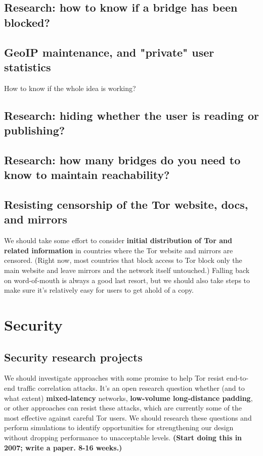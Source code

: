 \documentclass{article}
\newcommand{\plan}[1]{ {\bf (#1)}}
\begin{document}
\subsection{Research: how to know if a bridge has been blocked?}

\subsection{GeoIP maintenance, and "private" user statistics}
How to know if the whole idea is working?

\subsection{Research: hiding whether the user is reading or publishing?}

\subsection{Research: how many bridges do you need to know to maintain
reachability?}

\subsection{Resisting censorship of the Tor website, docs, and mirrors}

We should take some effort to consider {\bf initial distribution of Tor and
  related information} in countries where the Tor website and mirrors are
censored.  (Right now, most countries that block access to Tor block only the
main website and leave mirrors and the network itself untouched.)  Falling
back on word-of-mouth is always a good last resort, but we should also take
steps to make sure it's relatively easy for users to get ahold of a copy.

\section{Security}

\subsection{Security research projects}

We should investigate approaches with some promise to help Tor resist
end-to-end traffic correlation attacks.  It's an open research question
whether (and to what extent) {\bf mixed-latency} networks, {\bf low-volume
  long-distance padding}, or other approaches can resist these attacks, which
are currently some of the most effective against careful Tor users.  We
should research these questions and perform simulations to identify
opportunities for strengthening our design without dropping performance to
unacceptable levels. %
\plan{Start doing this in 2007; write a paper.  8-16 weeks.}
\end{document}

